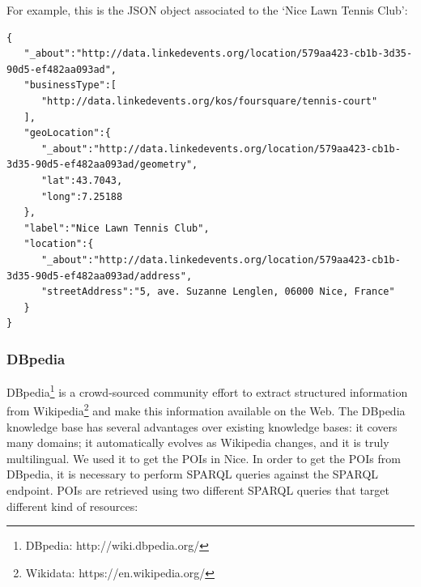 \documentclass[paper=a4, fontsize=11pt]{scrartcl}
\begin{document}
For example, this is the JSON object associated to the `Nice Lawn Tennis Club': \begin{lstlisting}
{
   "_about":"http://data.linkedevents.org/location/579aa423-cb1b-3d35-90d5-ef482aa093ad",
   "businessType":[
      "http://data.linkedevents.org/kos/foursquare/tennis-court"
   ],
   "geoLocation":{
      "_about":"http://data.linkedevents.org/location/579aa423-cb1b-3d35-90d5-ef482aa093ad/geometry",
      "lat":43.7043,
      "long":7.25188
   },
   "label":"Nice Lawn Tennis Club",
   "location":{
      "_about":"http://data.linkedevents.org/location/579aa423-cb1b-3d35-90d5-ef482aa093ad/address",
      "streetAddress":"5, ave. Suzanne Lenglen, 06000 Nice, France"
   }
}

\end{lstlisting}
\subsubsection{DBpedia}
DBpedia\footnote{DBpedia: http://wiki.dbpedia.org/} is a crowd-sourced community effort to extract structured information from Wikipedia\footnote{Wikidata: https://en.wikipedia.org/} and make this information available on the Web. The DBpedia knowledge base has several advantages over existing knowledge bases: it covers many domains; it automatically evolves as Wikipedia changes, and it is truly multilingual.
We used it to get the POIs in Nice.
In order to get the POIs from DBpedia, it is necessary to perform SPARQL queries against the SPARQL endpoint. POIs are retrieved using two different SPARQL queries that target different kind of resources:
\end{document}
